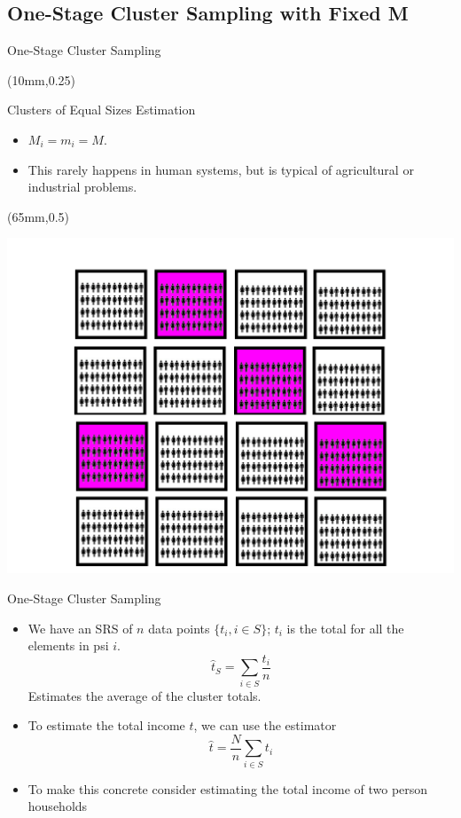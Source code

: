 \documentclass[10pt]{beamer}\usepackage[]{graphicx}\usepackage[]{xcolor}
\begin{document}
\subsection{One-Stage Cluster Sampling with Fixed M}

\begin{frame}{One-Stage Cluster Sampling}

\begin{textblock*}{100mm}(10mm,0.25\textheight)
\begin{block}{Clusters of Equal Sizes Estimation}
\begin{itemize}
\item $M_i=m_i=M$.
\item This rarely happens in human systems, but is typical of agricultural or industrial problems.
\end{itemize}
\end{block}
\end{textblock*}

\begin{textblock*}{50mm}(65mm,0.5\textheight)
\begin{block}{}
\includegraphics[width=1\linewidth]{figures/clusterEqual.png}
\end{block}
\end{textblock*}

\end{frame}

\begin{frame}{One-Stage Cluster Sampling}
\small
\begin{itemize}
\item We have an SRS of $n$ data points $\{ t_i, i \in S\}$; $t_i$ is the total for all the elements in psi $i$.
$$\hat{t}_S = \sum_{i\in S} \frac{t_i}{n}$$
Estimates the average of the cluster totals.
\item To estimate the total income $t$, we can use the estimator
$$\hat{t}= \frac{N}{n} \sum_{i \in S} t_i$$
\item To make this concrete consider estimating the total income of two person households 
\end{itemize}
\end{frame}
\end{document}
